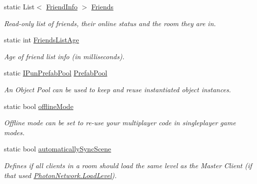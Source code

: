\begin{DoxyCompactItemize}
static List$<$ \hyperlink{class_friend_info}{Friend\+Info} $>$ \hyperlink{class_photon_network_afd22fd553d52fdc63e975c32ea47514f}{Friends}
\begin{DoxyCompactList}\small\item\em Read-\/only list of friends, their online status and the room they are in. \end{DoxyCompactList}\item 
static int \hyperlink{class_photon_network_a5aca6d5aea9bb5b55967959d1ecd0ccd}{Friends\+List\+Age}
\begin{DoxyCompactList}\small\item\em Age of friend list info (in milliseconds). \end{DoxyCompactList}\item 
static \hyperlink{interface_i_pun_prefab_pool}{I\+Pun\+Prefab\+Pool} \hyperlink{class_photon_network_a1ed1ac94f91b8746d218e22146eb515e}{Prefab\+Pool}
\begin{DoxyCompactList}\small\item\em An Object Pool can be used to keep and reuse instantiated object instances. \end{DoxyCompactList}\item 
static bool \hyperlink{class_photon_network_a4a1cd1887cb41a0592322527a7304ed7}{offline\+Mode}
\begin{DoxyCompactList}\small\item\em Offline mode can be set to re-\/use your multiplayer code in singleplayer game modes. \end{DoxyCompactList}\item 
static bool \hyperlink{class_photon_network_af721675dc5cf3c5ac4d4b67339246cdf}{automatically\+Sync\+Scene}
\begin{DoxyCompactList}\small\item\em Defines if all clients in a room should load the same level as the Master Client (if that used \hyperlink{class_photon_network_a5bb203a37b6db717583ea7b81fb56852}{Photon\+Network.\+Load\+Level}). \end{DoxyCompactList}\item 

\end{DoxyCompactItemize}
